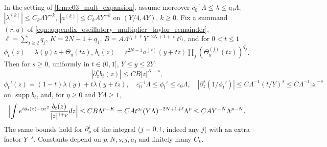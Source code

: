 \begin{lemma}
  \label{lem:c03_mult_summand}
  In the setting of \cref{lem:c03_mult_expansion}, assume moreover $c_0^{-1}\Lambda\le\lambda\le c_0\Lambda$, $|\lambda^{(k)}|\le C_k\Lambda Y^{-k}$, $|a^{(k)}|\le C_kAY^{-k}$ on $(Y/4,4Y)$, $k\ge0$.
  Fix a summand $(r,q)$ of \eqref{eqn:appendix_oscillatory_multiplier_taylor_remainder}, $\ell=\sum_{j\ge2}q_j$, $K=2N-1+q_1$, $B=A\Lambda^{q_1+\ell}Y^{-2N+1+\ell}t^{q_1}$, and for $0<t\le1$
  $\phi_t(z)=\lambda(y)z+\Theta_y(tz)$, $b_t(z)=z^{2N-1}a^{(r)}(y+tz)\prod_j(\Theta_y^{(j)}(tz))^{q_j}$. Then for $s\ge0$, uniformly in $t\in(0,1]$, $Y\le y\le2Y$:
  \begin{equation}\label{eqn:appendix_oscillatory_multiplier_remainder_symbols}
    |\partial_z^sb_t(z)|\le C B|z|^{K-s},
  \end{equation}
  \begin{equation}\label{eqn:appendix_oscillatory_multiplier_phase_derivative_bounds}
    \phi_t'(z)=(1-t)\lambda(y)+t\lambda(y+tz),\quad c_0^{-1}\Lambda\le\phi_t'\le c_0\Lambda,\quad |\partial_z^s(1/\phi_t')|\le C\Lambda^{-1}(t/Y)^s\le C\Lambda^{-1}|z|^{-s}
  \end{equation}
  on $\operatorname{supp}b_t$, and, for $\eta\ge0$ and $Y\Lambda\ge1$,
  \begin{equation}\label{eqn:appendix_oscillatory_multiplier_remainder_summand}
    \Bigl|\int e^{i\phi_t(z)-\eta z^2}\frac{b_t(z)}{|z|^{1+p}}dz\Bigr|\le CB\Lambda^{p-K}=CAt^{q_1}(Y\Lambda)^{-2N+1+\ell}\Lambda^{p}\le CAY^{-N}\Lambda^{p-N}.
  \end{equation}
  The same bounds hold for $\partial_y^j$ of the integral ($j=0,1$, indeed any $j$) with an extra factor $Y^{-j}$. Constants depend on $p,N,s,j,c_0$ and finitely many $C_k$.
\end{lemma}
